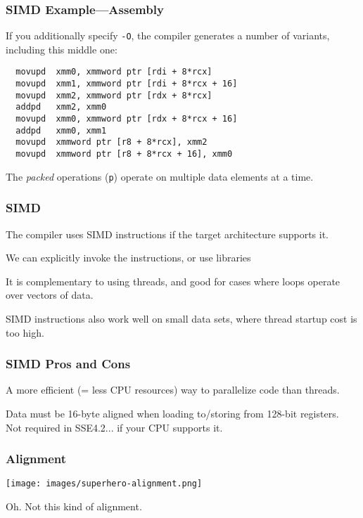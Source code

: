 \begin{frame}[fragile]
  \frametitle{SIMD Example---Assembly}

  If you additionally specify \texttt{-O}, the compiler generates a number of variants, including this middle one:
\begin{verbatim}
  movupd  xmm0, xmmword ptr [rdi + 8*rcx]
  movupd  xmm1, xmmword ptr [rdi + 8*rcx + 16]
  movupd  xmm2, xmmword ptr [rdx + 8*rcx]
  addpd   xmm2, xmm0
  movupd  xmm0, xmmword ptr [rdx + 8*rcx + 16]
  addpd   xmm0, xmm1
  movupd  xmmword ptr [r8 + 8*rcx], xmm2
  movupd  xmmword ptr [r8 + 8*rcx + 16], xmm0
\end{verbatim}

The \emph{packed} operations ({\tt p}) operate on multiple data
elements at a time.
\end{frame}


\begin{frame}
\frametitle{SIMD}

The compiler uses SIMD instructions if the target architecture supports it.

We can explicitly invoke the instructions, or use libraries

It is complementary to using threads, and good for cases where loops operate over vectors of data.

SIMD instructions also work well on small data sets, where thread startup
cost is too high.

\end{frame}


\begin{frame}
  \frametitle{SIMD Pros and Cons}

A more efficient (= less CPU resources) way to parallelize code than threads.

Data must be 16-byte aligned when loading to/storing from 128-bit registers.\\
\quad Not required in SSE4.2... if your CPU supports it.
  

\end{frame}


\begin{frame}
\frametitle{Alignment}

\begin{center}
	\texttt{[image: images/superhero-alignment.png]}
\end{center}

Oh. Not this kind of alignment.

\end{frame}



